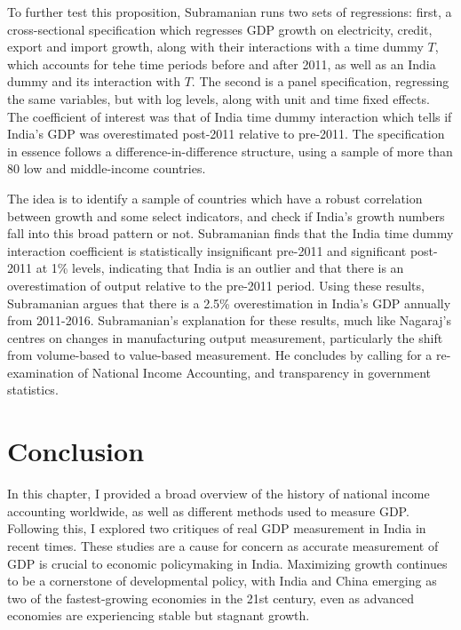 \documentclass[12pt,nobind, a4paper]{reedthesis}
\begin{document}
 To further test this proposition, Subramanian runs two sets of regressions: first, a cross-sectional specification which regresses GDP growth on electricity, credit, export and import growth, along with their interactions with a time dummy \(T\), which accounts for tehe time periods before and after 2011, as well as an India dummy and its interaction with \(T\). The second is a panel specification, regressing the same variables, but with log levels, along with unit and time fixed effects. The coefficient of interest was that of India time dummy interaction which tells if India's GDP was overestimated post-2011 relative to pre-2011. The specification in essence follows a difference-in-difference structure, using a sample of more than 80 low and middle-income countries.
 \linebreak

 The idea is to identify a sample of countries which have a robust correlation between growth and some select indicators, and check if India's growth numbers fall into this broad pattern or not. Subramanian finds that the India time dummy interaction coefficient is statistically insignificant pre-2011 and significant post-2011 at 1\% levels, indicating that India is an outlier and that there is an overestimation of output relative to the pre-2011 period. Using these results, Subramanian argues that there is a 2.5\% overestimation in India's GDP annually from 2011-2016. Subramanian's explanation for these results, much like Nagaraj's centres on changes in manufacturing output measurement, particularly the shift from volume-based to value-based measurement. He concludes by calling for a re-examination of National Income Accounting, and transparency in government statistics.

 \hypertarget{ccn}{%
 \section{Conclusion}\label{ccn}}

 In this chapter, I provided a broad overview of the history of national income accounting worldwide, as well as different methods used to measure GDP. Following this, I explored two critiques of real GDP measurement in India in recent times. These studies are a cause for concern as accurate measurement of GDP is crucial to economic policymaking in India. Maximizing growth continues to be a cornerstone of developmental policy, with India and China emerging as two of the fastest-growing economies in the 21st century, even as advanced economies are experiencing stable but stagnant growth.
 \linebreak
\end{document}
